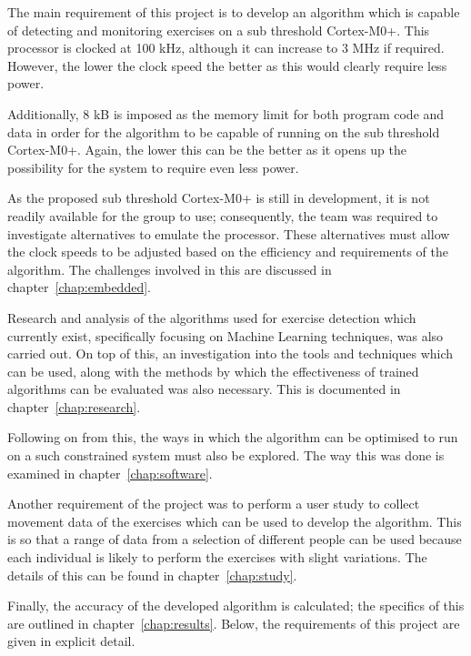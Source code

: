 \label{sec:intro:req}
The main requirement of this project is to develop an algorithm which is capable of detecting and monitoring exercises on a sub threshold Cortex-M0+. This processor is clocked at 100 kHz, although it can increase to 3 MHz if required. However, the lower the clock speed the better as this would clearly require less power.

Additionally, 8 kB is imposed as the memory limit for both program code and data in order for the algorithm to be capable of running on the sub threshold Cortex-M0+. Again, the lower this can be the better as it opens up the possibility for the system to require even less power.

As the proposed sub threshold Cortex-M0+ is still in development, it is not readily available for the group to use; consequently, the team was required to investigate alternatives to emulate the processor. These alternatives must allow the clock speeds to be adjusted based on the efficiency and requirements of the algorithm. The challenges involved in this are discussed in chapter~\ref{chap:embedded}.

Research and analysis of the algorithms used for exercise detection which currently exist, specifically focusing on Machine Learning techniques, was also carried out. On top of this, an investigation into the tools and techniques which can be used, along with the methods by which the effectiveness of trained algorithms can be evaluated was also necessary. This is documented in chapter~\ref{chap:research}.

Following on from this, the ways in which the algorithm can be optimised to run on a such constrained system must also be explored. The way this was done is examined in chapter~\ref{chap:software}.

Another requirement of the project was to perform a user study to collect movement data of the exercises which can be used to develop the algorithm. This is so that a range of data from a selection of different people can be used because each individual is likely to perform the exercises with slight variations. The details of this can be found in chapter~\ref{chap:study}.

Finally, the accuracy of the developed algorithm is calculated; the specifics of this are outlined in chapter~\ref{chap:results}.
Below, the requirements of this project are given in explicit detail.



